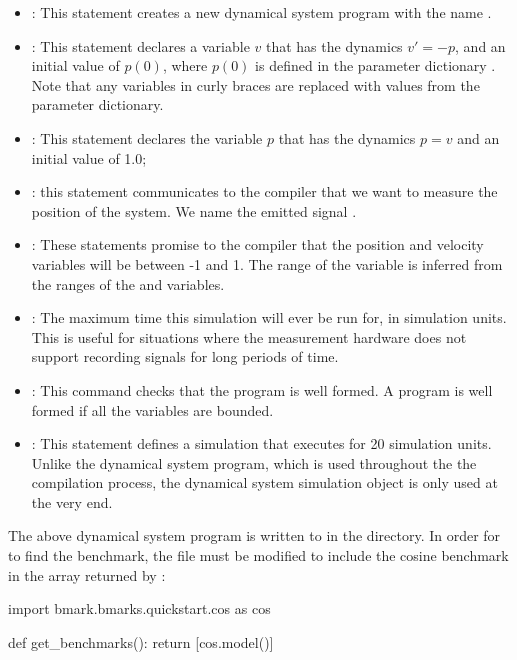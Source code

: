 \begin{itemize}
  \item{}: This statement creates a new  dynamical
    system program
    with the name . 
  \item {}: This statement declares a variable $v$ that has
    the dynamics $v' = -p$, and an initial value of $p(0)$, where $p(0)$ is
    defined in the parameter dictionary . Note that any variables in
    curly braces are replaced with values from the parameter dictionary.
  \item {}: This statement declares the variable $p$ that
      has the dynamics $p = v$ and an initial value of 1.0;
  \item {}: this  statement communicates to the
    compiler that we want to measure the position of the system. We name the
    emitted signal .
  \item{}: These statements
    promise to the compiler that the position and velocity variables will be
    between -1 and 1. The range of the  variable is inferred from the
    ranges of the  and  variables.
  \item{}: The maximum time this simulation will ever be
    run for, in simulation units. This is useful for situations where the
    measurement hardware does not support recording signals for long periods
    of time.
  \item{}: This command checks that the program is well formed. A
    program is well formed if all the variables are bounded. 
  \item{}: This statement defines a simulation that executes
    for 20 simulation units.  Unlike the dynamical system program, which is used
    throughout the the compilation process, the dynamical system simulation
    object is only used at the very end.
\end{itemize}

The above dynamical system program is written to  in the
 directory. In order for  to find the
benchmark, the  file must be modified to
include the cosine benchmark in the array returned by :

\begin{pysnippet}
  import bmark.bmarks.quickstart.cos as cos

  def get_benchmarks():
     return [cos.model()]
  
\end{pysnippet}


